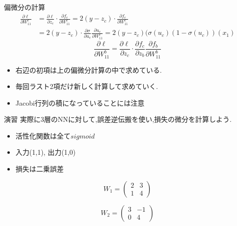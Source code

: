 \begin{frame}[fragile]{偏微分の計算}
\begin{align*}
\frac{\partial \ell}{\partial W^c_{11}} & =  \frac{\partial \ell}{\partial z_c}\cdot \frac{\partial f_c}{\partial W^c_{11}}= 2(y - z_c) \cdot \frac{\partial f_c}{\partial W^c_{11}} \\
  & = 2(y- z_c) \cdot \frac{\partial \sigma}{\partial u_c} \frac{\partial u_c}{\partial W^c_{11}} = 2(y-z_c)(\sigma(u_c)(1 - \sigma(u_c))(x_1)
\end{align*}
\begin{equation*}
\frac{\partial \ell}{\partial W^b_{11}} =  \frac{\partial \ell}{\partial z_c}\cdot  \frac{\partial f_c}{\partial z_b}\frac{\partial f_b}{\partial W^b_{11}}
\end{equation*}
\begin{itemize}
  \item 右辺の初項は上の偏微分計算の中で求めている.
  \item 毎回ラスト2項だけ新しく計算して求めていく.
\end{itemize}

\begin{itemize}
\item Jacobi行列の積になっていることには注意
\end{itemize}
\end{frame}


\begin{frame}[fragile]{演習}
実際に3層のNNに対して,誤差逆伝搬を使い,損失の微分を計算しよう.
\begin{itemize}
\item 活性化関数は全て$sigmoid$
\item 入力(1,1), 出力(1,0)
\item 損失は二乗誤差
\end{itemize}
\begin{equation*}
W_1 = \begin{pmatrix}
2 & 3 \\
1 & 4 
\end{pmatrix}
\end{equation*}

\begin{equation*}
W_2 = \begin{pmatrix}
3 & -1 \\
0 & 4 
\end{pmatrix}
\end{equation*}
\end{frame}

